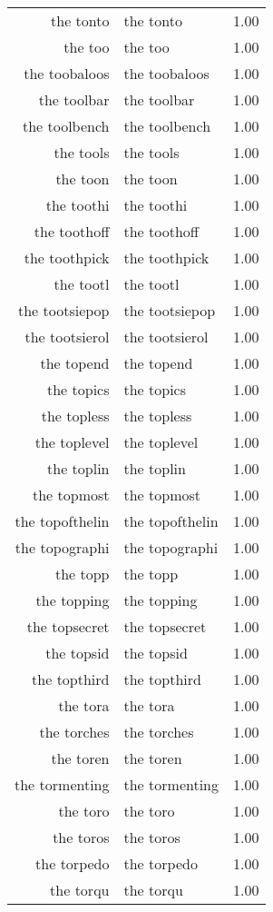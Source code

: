 \begin{table}[ht]
\begin{tabular}{rlr}
  the tonto & the tonto & 1.00 \\ 
  the too & the too & 1.00 \\ 
  the toobaloos & the toobaloos & 1.00 \\ 
  the toolbar & the toolbar & 1.00 \\ 
  the toolbench & the toolbench & 1.00 \\ 
  the tools & the tools & 1.00 \\ 
  the toon & the toon & 1.00 \\ 
  the toothi & the toothi & 1.00 \\ 
  the toothoff & the toothoff & 1.00 \\ 
  the toothpick & the toothpick & 1.00 \\ 
  the tootl & the tootl & 1.00 \\ 
  the tootsiepop & the tootsiepop & 1.00 \\ 
  the tootsierol & the tootsierol & 1.00 \\ 
  the topend & the topend & 1.00 \\ 
  the topics & the topics & 1.00 \\ 
  the topless & the topless & 1.00 \\ 
  the toplevel & the toplevel & 1.00 \\ 
  the toplin & the toplin & 1.00 \\ 
  the topmost & the topmost & 1.00 \\ 
  the topofthelin & the topofthelin & 1.00 \\ 
  the topographi & the topographi & 1.00 \\ 
  the topp & the topp & 1.00 \\ 
  the topping & the topping & 1.00 \\ 
  the topsecret & the topsecret & 1.00 \\ 
  the topsid & the topsid & 1.00 \\ 
  the topthird & the topthird & 1.00 \\ 
  the tora & the tora & 1.00 \\ 
  the torches & the torches & 1.00 \\ 
  the toren & the toren & 1.00 \\ 
  the tormenting & the tormenting & 1.00 \\ 
  the toro & the toro & 1.00 \\ 
  the toros & the toros & 1.00 \\ 
  the torpedo & the torpedo & 1.00 \\ 
  the torqu & the torqu & 1.00 \\ 

\end{tabular}
\end{table}
